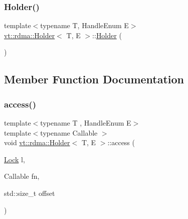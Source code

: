 \subsubsection{\texorpdfstring{Holder()}{Holder()}}
{\footnotesize\ttfamily template$<$typename T, Handle\+Enum E$>$ \\
\hyperlink{structvt_1_1rdma_1_1_holder}{vt\+::rdma\+::\+Holder}$<$ T, E $>$\+::\hyperlink{structvt_1_1rdma_1_1_holder}{Holder} (\begin{DoxyParamCaption}{ }\end{DoxyParamCaption})\hspace{0.3cm}{\ttfamily [default]}}



\subsection{Member Function Documentation}
\mbox{\label{structvt_1_1rdma_1_1_holder_a352b9ae14f0f60cee7df78231d2debfe}} 
\subsubsection{\texorpdfstring{access()}{access()}}
{\footnotesize\ttfamily template$<$typename T , Handle\+Enum E$>$ \\
template$<$typename Callable $>$ \\
void \hyperlink{structvt_1_1rdma_1_1_holder}{vt\+::rdma\+::\+Holder}$<$ T, E $>$\+::access (\begin{DoxyParamCaption}\item[{\hyperlink{namespacevt_1_1rdma_ac5c20b41a653e520b6305d4d454ecb70}{Lock}}]{l,  }\item[{Callable}]{fn,  }\item[{std\+::size\+\_\+t}]{offset }\end{DoxyParamCaption})}

\mbox{\label{structvt_1_1rdma_1_1_holder_affd535937b2b5e3bd243e4cae43d779e}} 
